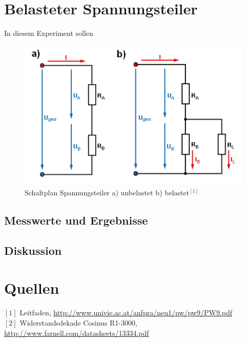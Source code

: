 \documentclass[12pt,a4paper]{article}
\begin{document}
\begin{multicols}{2}
\section{Belasteter Spannungsteiler}
In diesem Experiment sollen 
\begin{figure}[H]
	\centering
	\includegraphics[scale=0.4]{./figure/spannungsteiler_schaltplan.png}
	\caption{Schaltplan Spannungsteiler a) unbelastet b) belastet$^{[1]}$}
	\label{fig:schaltbild_solarzelle}
\end{figure}
\noindent

\subsection{Messwerte und Ergebnisse}



\subsection{Diskussion}



\section{Quellen}
$[1]$ Leitfaden, \url{http://www.univie.ac.at/anfpra/neu1/pw/pw9/PW9.pdf}\\
$[2]$ Widerstandsdekade Cosinus R1-3000, \url{http://www.farnell.com/datasheets/13334.pdf}\\

\end{multicols}
\end{document}

